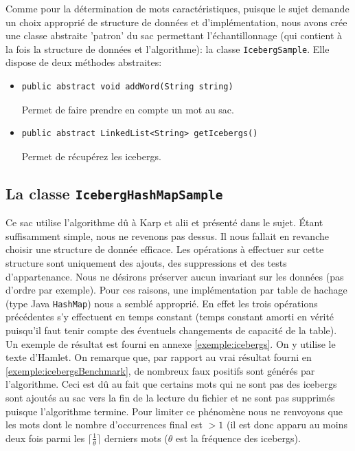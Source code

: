 \documentclass[12pt,a4paper,titlepage]{article}
\newcommand{\class}[1]{\texttt{#1}}
\begin{document}
Comme pour la détermination de mots caractéristiques, puisque le sujet demande un choix approprié de structure de données et d'implémentation, nous avons crée une classe abstraite 'patron' du sac permettant l'échantillonnage (qui contient à la fois la structure de données et l'algorithme): la classe \class{IcebergSample}. Elle dispose de deux méthodes abstraites:

\begin{itemize}
\item \begin{lstlisting}
public abstract void addWord(String string)
\end{lstlisting}
Permet de faire prendre en compte un mot au sac.

\item \begin{lstlisting}
public abstract LinkedList<String> getIcebergs()
\end{lstlisting}
Permet de récupérez les icebergs.
\end{itemize}

\subsection{La classe \class{IcebergHashMapSample}}

Ce sac utilise l'algorithme dû à Karp et alii et présenté dans le sujet. Étant suffisamment simple, nous ne revenons pas dessus. Il nous fallait en revanche choisir une structure de donnée efficace. Les opérations à effectuer sur cette structure sont uniquement des ajouts, des suppressions et des tests d'appartenance. Nous ne désirons préserver aucun invariant sur les données (pas d'ordre par exemple). Pour ces raisons, une implémentation par table de hachage (type Java \class{HashMap}) nous a semblé approprié. En effet les trois opérations précédentes s'y effectuent en temps constant (temps constant amorti en vérité puisqu'il faut tenir compte des éventuels changements de capacité de la table).\\

Un exemple de résultat est fourni en annexe \ref{exemple:icebergs}. On y utilise le texte d'Hamlet. On remarque que, par rapport au vrai résultat fourni en \ref{exemple:icebergsBenchmark}, de nombreux faux positifs sont générés par l'algorithme. Ceci est dû au fait que certains mots qui ne sont pas des icebergs sont ajoutés au sac vers la fin de la lecture du fichier et ne sont pas supprimés puisque l'algorithme termine. Pour limiter ce phénomène nous ne renvoyons que les mots dont le nombre d'occurrences final est $>1$ (il est donc apparu au moins deux fois parmi les $\lceil\frac{1}{\theta}\rceil$ derniers mots ($\theta$ est la fréquence des icebergs).
\end{document}
